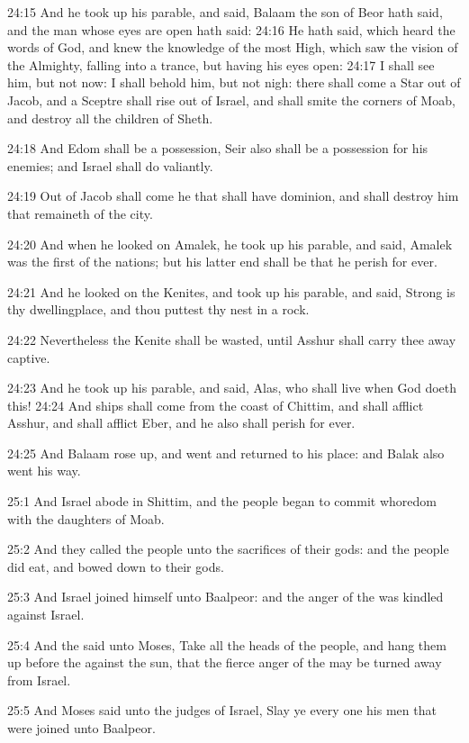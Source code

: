 24:15 And he took up his parable, and said, Balaam the son of Beor
hath said, and the man whose eyes are open hath said: 24:16 He hath
said, which heard the words of God, and knew the knowledge of the most
High, which saw the vision of the Almighty, falling into a trance, but
having his eyes open: 24:17 I shall see him, but not now: I shall
behold him, but not nigh: there shall come a Star out of Jacob, and a
Sceptre shall rise out of Israel, and shall smite the corners of Moab,
and destroy all the children of Sheth.

24:18 And Edom shall be a possession, Seir also shall be a possession
for his enemies; and Israel shall do valiantly.

24:19 Out of Jacob shall come he that shall have dominion, and shall
destroy him that remaineth of the city.

24:20 And when he looked on Amalek, he took up his parable, and said,
Amalek was the first of the nations; but his latter end shall be that
he perish for ever.

24:21 And he looked on the Kenites, and took up his parable, and said,
Strong is thy dwellingplace, and thou puttest thy nest in a rock.

24:22 Nevertheless the Kenite shall be wasted, until Asshur shall
carry thee away captive.

24:23 And he took up his parable, and said, Alas, who shall live when
God doeth this!  24:24 And ships shall come from the coast of Chittim,
and shall afflict Asshur, and shall afflict Eber, and he also shall
perish for ever.

24:25 And Balaam rose up, and went and returned to his place: and
Balak also went his way.

25:1 And Israel abode in Shittim, and the people began to commit
whoredom with the daughters of Moab.

25:2 And they called the people unto the sacrifices of their gods: and
the people did eat, and bowed down to their gods.

25:3 And Israel joined himself unto Baalpeor: and the anger of the
\LORD was kindled against Israel.

25:4 And the \LORD said unto Moses, Take all the heads of the people,
and hang them up before the \LORD against the sun, that the fierce
anger of the \LORD may be turned away from Israel.

25:5 And Moses said unto the judges of Israel, Slay ye every one his
men that were joined unto Baalpeor.

